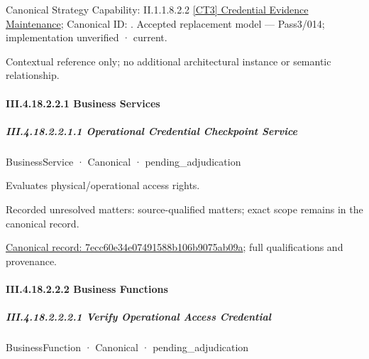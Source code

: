 {\small Canonical Strategy Capability: II.1.1.8.2.2 \hyperref[element:ece496e1dc7e4a319318ef6811dfece7]{[CT3] Credential Evidence Maintenance}; Canonical ID: \texttt{}. Accepted replacement model — Pass3/014; implementation unverified · current.}\par
Contextual reference only; no additional architectural instance or semantic relationship.\par
\paragraph*{III.4.18.2.2.1 Business Services}
\label{navigation:III.4.18.2.2.1}

\subparagraph*{III.4.18.2.2.1.1 Operational Credential Checkpoint Service}
\label{navigation:III.4.18.2.2.1.1}

\label{element:7ecc60e34e07491588b106b9075ab09a}
{\small BusinessService · Canonical · pending\_adjudication}\par

Evaluates physical/operational access rights.


{\small Recorded unresolved matters: source-qualified matters; exact scope remains in the canonical record.}\par
{\footnotesize \href{../../../../continuum/business/business-service/7ecc60e34e07491588b106b9075ab09a.md}{Canonical record: 7ecc60e34e07491588b106b9075ab09a}; full qualifications and provenance.}\par
\paragraph*{III.4.18.2.2.2 Business Functions}
\label{navigation:III.4.18.2.2.2}

\subparagraph*{III.4.18.2.2.2.1 Verify Operational Access Credential}
\label{navigation:III.4.18.2.2.2.1}

\label{element:a0eb34a7cb7046fd880248e799632810}
{\small BusinessFunction · Canonical · pending\_adjudication}\par

